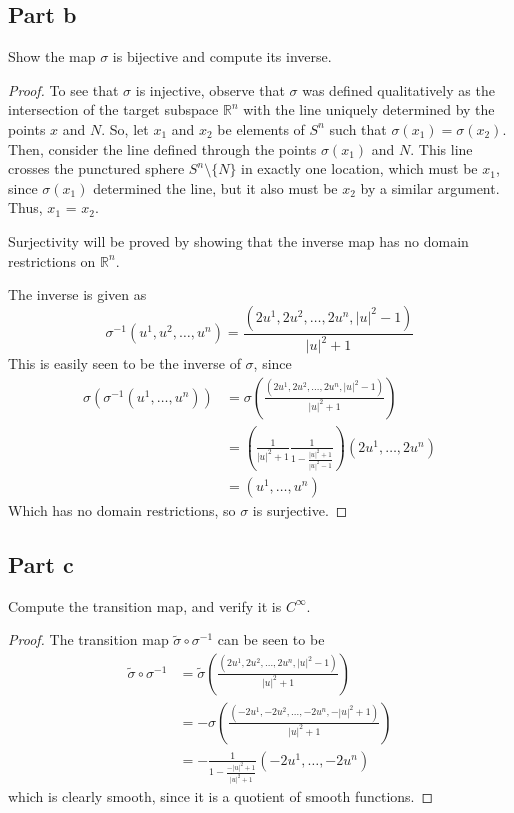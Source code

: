 \documentclass[fontsize=11pt]{scrartcl} %
\numberwithin{equation}{section} %
\numberwithin{figure}{section} %
\numberwithin{table}{section} %
\begin{document}
\subsection*{Part b}
Show the map $\sigma$ is bijective and compute its inverse.
\\
\begin{proof}
To see that $\sigma$ is injective, observe that $\sigma$ was defined
qualitatively as the intersection of the target subspace $\mathbb{R}^n$
with the line uniquely determined by the points $x$ and $N$.
So, let $x_1$ and $x_2$ be elements of $S^n$ such that $\sigma(x_1) = \sigma(x_2)$.
Then, consider the line defined through the points $\sigma(x_1)$ and $N$.
This line crosses the punctured sphere $S^n\setminus\{N\}$ in exactly one location,
which must be $x_1$, since $\sigma(x_1)$ determined the line, but it also must be $x_2$
by a similar argument. Thus, $x_1$ = $x_2$.

Surjectivity will be proved by showing that the inverse map has no domain restrictions
on $\mathbb{R}^n$.

The inverse is given as
\[
\sigma^{-1}(u^1,u^2,\ldots,u^n) = \frac{(2u^1,2u^2,\ldots,2u^n,|u|^2-1)}{|u|^2+1}
\]
This is easily seen to be the inverse of $\sigma$, since
\[
\begin{aligned}
\sigma(\sigma^{-1}(u^1,\ldots,u^n)) &= \sigma( \frac{(2u^1,2u^2,\ldots,2u^n,|u|^2-1)}{|u|^2+1})\\
        &=\left(\frac{1}{|u|^2+1}\frac{1}{1-\frac{|u|^2+1}{|u|^2-1}}\right)(2u^1,\ldots,2u^n)\\
        &=(u^1,\ldots,u^n)
\end{aligned}
\]
Which has no domain restrictions, so $\sigma$ is surjective.

\end{proof}

\subsection*{Part c}
Compute the transition map, and verify it is $C^{\infty}$.
\\
\begin{proof}
The transition map $\widetilde{\sigma}\circ\sigma^{-1}$ can be seen to be
\[
\begin{aligned}
\widetilde{\sigma}\circ\sigma^{-1} &= \widetilde{\sigma}\left( \frac{(2u^1,2u^2,\ldots,2u^n,|u|^2-1)}{|u|^2+1}\right)\\
        &= -\sigma\left(\frac{(-2u^1,-2u^2,\ldots,-2u^n,-|u|^2+1)}{|u|^2+1}\right)\\
        &= -\frac{1}{1-\frac{-|u|^2+1}{|u|^2+1}}\left(-2u^1,\ldots,-2u^n\right)
\end{aligned}
\]
which is clearly smooth, since it is a quotient of smooth functions.
\end{proof}
\end{document}
